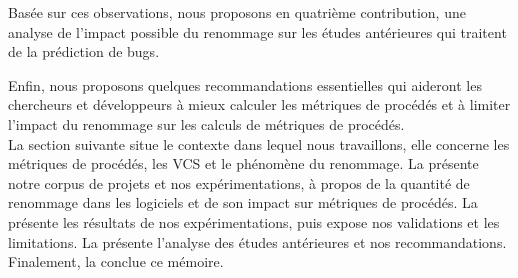 Basée sur ces observations, nous proposons en quatrième contribution, une analyse de l'impact possible du renommage sur les études antérieures qui traitent de la prédiction de bugs. 

Enfin, nous proposons quelques recommandations essentielles qui aideront les chercheurs et développeurs à mieux calculer les métriques de procédés et à limiter l'impact du renommage sur les calculs de métriques de procédés.\\

La section suivante situe le contexte dans lequel nous travaillons, elle concerne les métriques de procédés, les VCS et le phénomène du renommage. La  présente notre corpus de projets et nos expérimentations, à propos de la quantité de renommage dans les logiciels et de son impact sur métriques de procédés. La  présente les résultats de nos expérimentations, puis expose nos validations et les limitations. La  présente l'analyse des études antérieures et nos recommandations. Finalement, la  conclue ce mémoire.\\     


